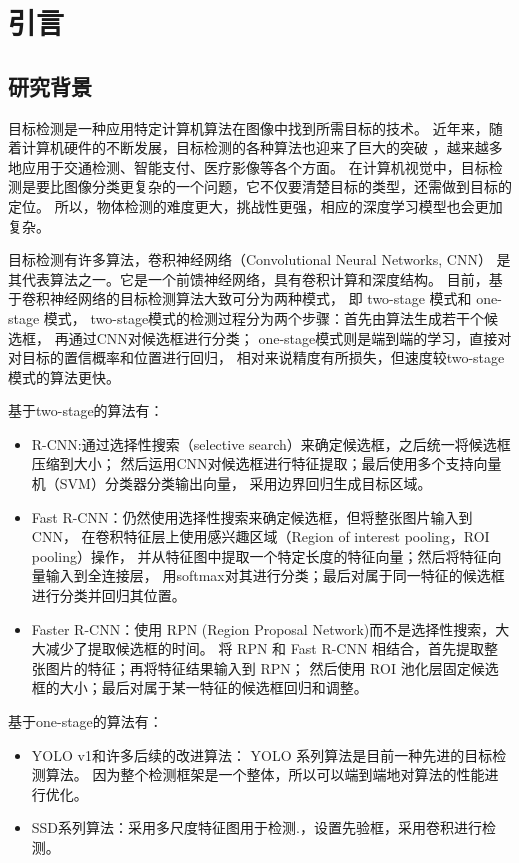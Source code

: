 \chapter{引言}
\section{研究背景}
\par
目标检测是一种应用特定计算机算法在图像中找到所需目标的技术。
近年来，随着计算机硬件的不断发展，目标检测的各种算法也迎来了巨大的突破
，越来越多地应用于交通检测、智能支付、医疗影像等各个方面。
在计算机视觉中，目标检测是要比图像分类更复杂的一个问题，它不仅要清楚目标的类型，还需做到目标的定位。
所以，物体检测的难度更大，挑战性更强，相应的深度学习模型也会更加复杂。
\par
目标检测有许多算法，卷积神经网络（Convolutional Neural Networks, CNN）
是其代表算法之一。它是一个前馈神经网络，具有卷积计算和深度结构。
目前，基于卷积神经网络的目标检测算法大致可分为两种模式，
即 two-stage 模式和 one-stage 模式，
two-stage模式的检测过程分为两个步骤：首先由算法生成若干个候选框，
再通过CNN对候选框进行分类；
one-stage模式则是端到端的学习，直接对对目标的置信概率和位置进行回归，
相对来说精度有所损失，但速度较two-stage模式的算法更快。
\par
基于two-stage的算法有：
\begin{itemize}
    \item R-CNN:通过选择性搜索（selective search）来确定候选框，之后统一将候选框压缩到大小；
    然后运用CNN对候选框进行特征提取；最后使用多个支持向量机（SVM）分类器分类输出向量，
    采用边界回归生成目标区域。
    \item Fast R-CNN：仍然使用选择性搜索来确定候选框，但将整张图片输入到CNN，
    在卷积特征层上使用感兴趣区域（Region of interest pooling，ROI pooling）操作，
    并从特征图中提取一个特定长度的特征向量；然后将特征向量输入到全连接层，
    用softmax对其进行分类；最后对属于同一特征的候选框进行分类并回归其位置。
    \item Faster R-CNN：使用 RPN (Region Proposal Network)而不是选择性搜索，大大减少了提取候选框的时间。
    将 RPN 和 Fast R-CNN 相结合，首先提取整张图片的特征；再将特征结果输入到 RPN；
    然后使用 ROI 池化层固定候选框的大小；最后对属于某一特征的候选框回归和调整。
\end{itemize}
\par
基于one-stage的算法有：
\begin{itemize}
    \item YOLO v1和许多后续的改进算法：
    YOLO 系列算法是目前一种先进的目标检测算法。
    因为整个检测框架是一个整体，所以可以端到端地对算法的性能进行优化。
    \item SSD系列算法：采用多尺度特征图用于检测.，设置先验框，采用卷积进行检测。
\end{itemize}
